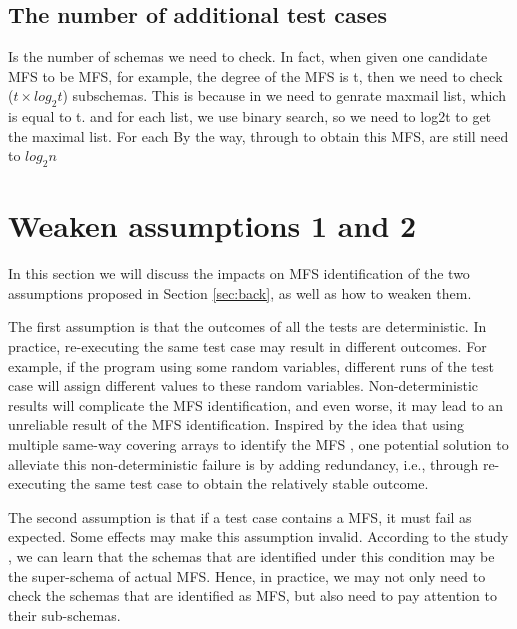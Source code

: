 \documentclass{sig-alternate-05-2015}
\begin{document}
{{{{\subsection{The number of additional  test cases}

Is the number of schemas we need to check. In fact, when given one candidate MFS to be MFS, for example, the degree of the MFS is t, then we need to check ($t \times log_{2} t$) subschemas. This is because in we need to genrate maxmail list, which is equal to t. and for each list, we use binary search, so we need to log2t to get the maximal list. For each 
By the way, through to obtain this MFS, are still need to $log_{2}n$


\section{Weaken assumptions 1 and 2}
In this section we will discuss the impacts on MFS identification of the two assumptions proposed in Section \ref{sec:back}, as well as how to weaken them.

The first assumption is that the outcomes of all the tests are deterministic. In practice, re-executing the same test case may result in different outcomes. For example, if the program using some random variables, different runs of the test case will assign different
values to these random variables. Non-deterministic results will complicate the MFS identification, and even worse, it may lead to an unreliable result of the MFS identification. Inspired by the idea that using multiple same-way covering arrays to identify the MFS \cite{fouche2009incremental,yilmaz2006covering}, one potential solution to alleviate this non-deterministic failure is by adding redundancy, i.e., through re-executing the same test case to obtain the relatively stable outcome.

The second assumption is that if a test case contains a MFS, it must fail as expected. Some effects \cite{Masri:2014:PCC:2582050.2559932,yilmaz2013reducing} may make this assumption invalid. According to the study \cite{zhang2011characterizing}, we can learn that the schemas that are identified under this condition may be the super-schema of actual MFS. Hence, in practice, we may not only need to check the schemas that are identified as MFS, but also need to pay attention to their sub-schemas.

}}}}
\end{document}
